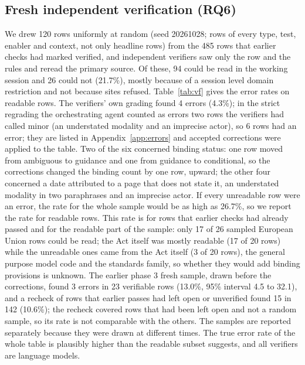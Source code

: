 \documentclass[conference]{IEEEtran}
\begin{document}
\subsection{Fresh independent verification (RQ6)}\label{sec:verify}
We drew 120 rows uniformly at random (seed 20261028; rows of every type, test, enabler and context, not only headline rows) from the 485 rows that earlier checks had marked verified, and independent verifiers saw only the row and the rules and reread the primary source. Of these, 94 could be read in the working session and 26 could not (21.7\%), mostly because of a session level domain restriction and not because sites refused. Table~\ref{tab:vf} gives the error rates on readable rows. The verifiers' own grading found 4 errors (4.3\%); in the strict regrading the orchestrating agent counted as errors two rows the verifiers had called minor (an understated modality and an imprecise actor), so 6 rows had an error; they are listed in Appendix~\ref{app:errors} and accepted corrections were applied to the table. Two of the six concerned binding status: one row moved from ambiguous to guidance and one from guidance to conditional, so the corrections changed the binding count by one row, upward; the other four concerned a date attributed to a page that does not state it, an understated modality in two paraphrases and an imprecise actor. If every unreadable row were an error, the rate for the whole sample would be as high as 26.7\%, so we report the rate for readable rows. This rate is for rows that earlier checks had already passed and for the readable part of the sample: only 17 of 26 sampled European Union rows could be read; the Act itself was mostly readable (17 of 20 rows) while the unreadable ones came from the Act itself (3 of 20 rows), the general purpose model code and the standards family, so whether they would add binding provisions is unknown. The earlier phase 3 fresh sample, drawn before the corrections, found 3 errors in 23 verifiable rows (13.0\%, 95\% interval 4.5 to 32.1), and a recheck of rows that earlier passes had left open or unverified found 15 in 142 (10.6\%); the recheck covered rows that had been left open and not a random sample, so its rate is not comparable with the others. The samples are reported separately because they were drawn at different times. The true error rate of the whole table is plausibly higher than the readable subset suggests, and all verifiers are language models.

\begin{table}[t]\centering\small
{}
\caption{Fresh verification sample, readable rows only.}\label{tab:vf}
\end{table}
\end{document}
